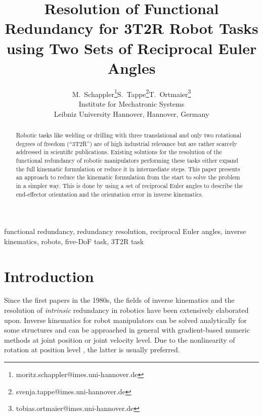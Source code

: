 \documentclass[twocolumn,10pt]{IFTOMM}
\begin{document}
\def\papernumber{IK xxx}
\def\conference_name{15th IFToMM World Congress, Krakow, Poland, 30 June--4 July, 2019}
\title{Resolution of Functional Redundancy for 3T2R Robot Tasks  \\ using Two Sets of Reciprocal Euler Angles}

\author{
    \begin{tabular}{cccc}
    M.\ Schappler\thanks{moritz.schappler@imes.uni-hannover.de}
& S.\ Tappe\thanks{svenja.tappe@imes.uni-hannover.de}
& T.\ Ortmaier\thanks{tobias.ortmaier@imes.uni-hannover.de}\\
    \multicolumn{3}{c}{Institute for Mechatronic Systems} \\
    \multicolumn{3}{c}{Leibniz University Hannover, Hannover, Germany}
    \end{tabular}
}

\maketitle

\begin{abstract}
Robotic tasks like welding or drilling with three translational and only two rotational degrees of freedom (``3T2R'') are of high industrial relevance but are ra\-ther scarcely addressed in scientific publications.
Existing solutions for the resolution of the functional redundancy of robotic manipulators performing these tasks either expand the full kinematic formulation or reduce it in intermediate steps.
This paper presents an approach to reduce the kinematic formulation from the start to solve the problem in a simpler way.
This is done by using a set of reciprocal Euler angles to describe the end-effector orientation and the orientation error in inverse kinematics.
\end{abstract}

\begin{keywords}
functional redundancy, redundancy resolution, reciprocal Euler angles, inverse kinematics, robots, five-DoF task, 3T2R task
\end{keywords}

\section{Introduction}
\label{sec:Intro}
Since the first papers in the 1980s, the fields of inverse kinematics \cite{GoldenbergBenFen1985} and the resolution of \emph{intrinsic} redundancy \cite{Yoshikawa1984} in robotics have been extensively elaborated upon.
Inverse kinematics for robot manipulators can be solved analytically for some structures and can be approached in general with gradient-based numeric methods at  joint position or joint velocity level.
Due to the nonlinearity of rotation at position level \cite{GoldenbergBenFen1985}, the latter is usually preferred.
\end{document}
